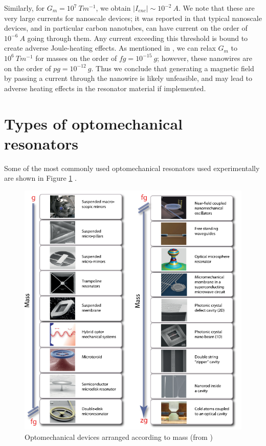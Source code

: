 \documentclass[%
 reprint,
nofootinbib,
 amsmath,amssymb,
 aps,
]{revtex4-2}
\begin{document}
Similarly, for $G_m = 10^7 \  Tm^{-1}$, we obtain $\big | I_{enc} \big | \sim 10^{-2}\ A$. We note that these are very large currents for nanoscale devices; it was reported in \cite{I_V_CNT} that typical nanoscale devices, and in particular carbon nanotubes, can have current on the order of $10^{-6}\ A$ going through them. Any current exceeding this threshold is bound to create adverse Joule-heating effects. As mentioned in \cite{project_paper}, we can relax $G_m$ to $10^6  \ Tm^{-1}$ for  masses on the order of $fg = 10^{-15} \ g$; however, these nanowires are on the order of $pg = 10^{-12}\ g$. Thus we conclude that generating a magnetic field by passing a current through the nanowire is likely unfeasible, and may lead to adverse heating effects in the resonator material if implemented. 

\section{Types of optomechanical resonators}\label{Types of optomechanical resonators}
Some of the most commonly used optomechanical resonators used experimentally are shown in Figure \ref{fig:optomechanical_devices} \cite{cavity_optomechanics_2014}.


\centering
\begin{center}
    \begin{figure}[htb]
    \centering
    \includegraphics[width = \columnwidth]{optomechanical_devices.PNG}
    \caption{Optomechanical devices arranged according to mass (from \cite{cavity_optomechanics_2014})}
    \label{fig:optomechanical_devices}
\end{figure}
\end{center}
\end{document}
